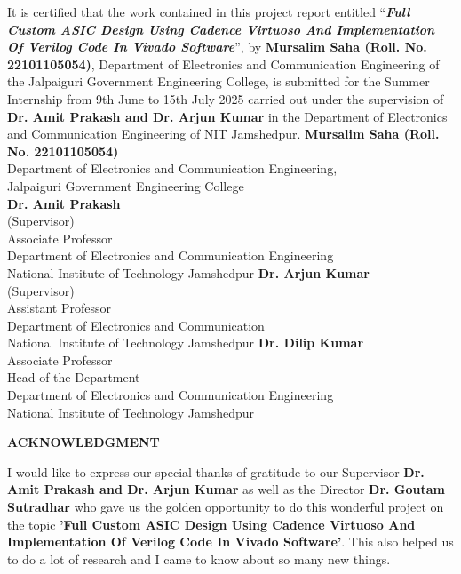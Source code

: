 \documentclass[12pt]{article}
\begin{document}
It is certified that the work contained in this project report entitled ``\textbf{\textit{Full Custom ASIC Design Using Cadence Virtuoso And Implementation Of Verilog Code
In Vivado Software}}'', by \textbf{Mursalim Saha (Roll. No. 22101105054)}, Department of Electronics and Communication Engineering of the Jalpaiguri Government Engineering College, is submitted for the Summer Internship from 9th June to 15th July 2025 carried out under the supervision of \textbf{Dr. Amit Prakash and Dr. Arjun Kumar} in the Department of Electronics and Communication Engineering of NIT Jamshedpur.
\vskip 0.3in
\noindent \textbf{Mursalim Saha (Roll. No. 22101105054)}\\
Department of Electronics and Communication Engineering,\\
Jalpaiguri Government Engineering College\\
\vskip 0.3in
\noindent \textbf{Dr. Amit Prakash}\\
(Supervisor) \\
Associate Professor \\
Department of Electronics and Communication Engineering\\
National Institute of Technology Jamshedpur
\vskip 0.3in
\noindent \textbf{Dr. Arjun Kumar}\\
(Supervisor) \\ 
Assistant Professor \\
Department of Electronics and Communication\\
National Institute of Technology Jamshedpur
\vskip 0.3in
\noindent \textbf{Dr. Dilip Kumar}\\
Associate Professor \\
Head of the Department \\ 
Department of Electronics and Communication Engineering\\
National Institute of Technology Jamshedpur
\newpage
\begin{center}
\begin{large}
{\bf ACKNOWLEDGMENT}
\end{large}
\end{center}
\vskip 0.2in
I would like to express our special thanks of gratitude to our Supervisor \textbf{Dr. Amit Prakash and Dr. Arjun Kumar} as well as the Director \textbf{Dr. Goutam Sutradhar} who gave us the golden opportunity to do this wonderful project on the topic \textbf{'Full Custom ASIC Design Using Cadence Virtuoso And Implementation Of Verilog Code
In Vivado Software'}. This also helped us to do a lot of research and I came to know about so many new things.
\end{document}
